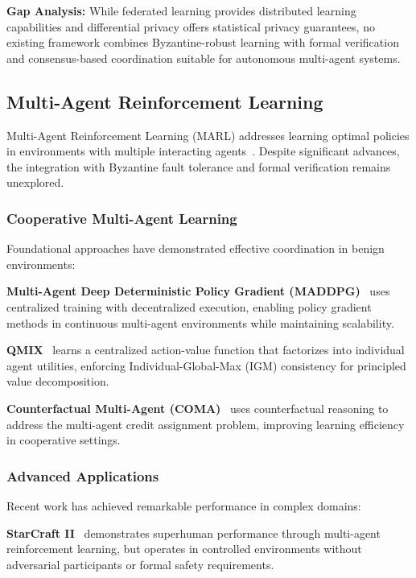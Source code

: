 \documentclass[conference]{IEEEtran}
\begin{document}
\textbf{Gap Analysis:} While federated learning provides distributed learning capabilities and differential privacy offers statistical privacy guarantees, no existing framework combines Byzantine-robust learning with formal verification and consensus-based coordination suitable for autonomous multi-agent systems.

\subsection{Multi-Agent Reinforcement Learning}

Multi-Agent Reinforcement Learning (MARL) addresses learning optimal policies in environments with multiple interacting agents~\cite{zhang2021multi}. Despite significant advances, the integration with Byzantine fault tolerance and formal verification remains unexplored.

\subsubsection{Cooperative Multi-Agent Learning}

Foundational approaches have demonstrated effective coordination in benign environments:

\textbf{Multi-Agent Deep Deterministic Policy Gradient (MADDPG)}~\cite{lowe2017multi} uses centralized training with decentralized execution, enabling policy gradient methods in continuous multi-agent environments while maintaining scalability.

\textbf{QMIX}~\cite{rashid2018qmix} learns a centralized action-value function that factorizes into individual agent utilities, enforcing Individual-Global-Max (IGM) consistency for principled value decomposition.

\textbf{Counterfactual Multi-Agent (COMA)}~\cite{foerster2018counterfactual} uses counterfactual reasoning to address the multi-agent credit assignment problem, improving learning efficiency in cooperative settings.

\subsubsection{Advanced Applications}

Recent work has achieved remarkable performance in complex domains:

\textbf{StarCraft II}~\cite{vinyals2019grandmaster} demonstrates superhuman performance through multi-agent reinforcement learning, but operates in controlled environments without adversarial participants or formal safety requirements.
\end{document}
